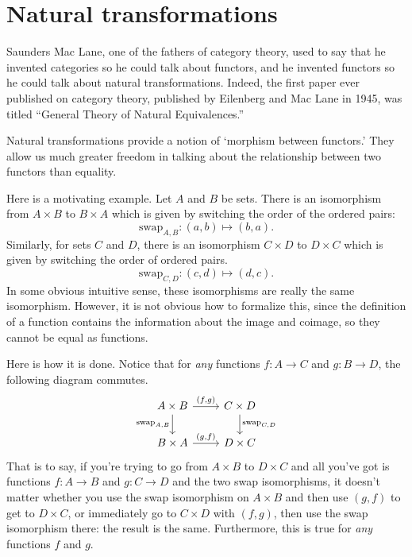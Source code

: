\documentclass[a4paper,10pt]{scrreprt}
\theoremstyle{definition}
\theoremstyle{plain}
\theoremstyle{remark}
\begin{document}
\section{Natural transformations} \label{sec:naturaltransformations}
Saunders Mac Lane, one of the fathers of category theory, used to say that he invented categories so he could talk about functors, and he invented functors so he could talk about natural transformations. Indeed, the first paper ever published on category theory, published by Eilenberg and Mac Lane in 1945, was titled ``General Theory of Natural Equivalences.'' \cite{awodey-intro-to-categories}

Natural transformations provide a notion of `morphism between functors.' They allow us much greater freedom in talking about the relationship between two functors than equality.

Here is a motivating example. Let $A$ and $B$ be sets. There is an isomorphism from $A \times B$ to $B \times A$ which is given by switching the order of the ordered pairs:
\begin{equation*}
  \mathrm{swap}_{A, B}\colon (a, b) \mapsto (b, a).
\end{equation*}
Similarly, for sets $C$ and $D$, there is an isomorphism $C \times D$ to $D \times C$ which is given by switching the order of ordered pairs.
\begin{equation*}
  \mathrm{swap}_{C, D}\colon (c, d) \mapsto (d, c).
\end{equation*}
In some obvious intuitive sense, these isomorphisms are really the same isomorphism. However, it is not obvious how to formalize this, since the definition of a function contains the information about the image and coimage, so they cannot be equal as functions. 

Here is how it is done. Notice that for \emph{any} functions $f\colon A \to C$ and $g\colon B \to D$, the following diagram commutes.
\begin{equation*}
  \begin{tikzcd}
    A \times B
    \arrow[r, "{(f, g)}"]
    \arrow[d, swap, "{\text{swap}_{A, B}}"]
    & C \times D
    \arrow[d, "{\text{swap}_{C, D}}"]
    \\
    B \times A
    \arrow[r, "{(g, f)}"]
    & D \times C
  \end{tikzcd}
\end{equation*}
That is to say, if you're trying to go from $A \times B$ to $D \times C$ and all you've got is functions $f\colon A \to B$ and $g\colon C \to D$ and the two swap isomorphisms, it doesn't matter whether you use the swap isomorphism on $A \times B$ and then use $(g, f)$ to get to $D \times C$, or immediately go to $C \times D$ with $(f, g)$, then use the swap isomorphism there: the result is the same. Furthermore, this is true for \emph{any} functions $f$ and $g$.
\end{document}
